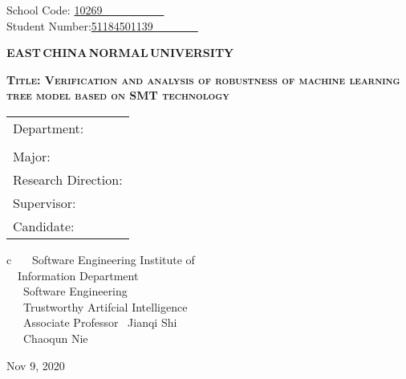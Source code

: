 \newpage

\pagestyle{empty}

\hskip 1.4cm {School Code: \underline{10269~~~~~~~~~~~\qquad}}\\
\hspace*{\fill} {Student Number:\underline{51184501139~~~~~~~~}}
\vskip 2cm

\begin{center}
{\Huge \bf EAST\,CHINA\,NORMAL\,UNIVERSITY}
\end{center}

\vskip 3cm

\begin{center}
{\huge \bf \scshape Title: Verification and analysis of robustness of machine learning tree model based on SMT technology}
\end{center}

\vskip 2cm {\large
\begin{center}
\begin{tabular}{l}
Department:\\
			\\
Major:\\
Research Direction:\\
Supervisor:\\
Candidate:
\end{tabular}
\begin{tabular}c
~~~Software Engineering Institute of\\
\hline ~~Information Department  \\
\hline ~~~Software Engineering  \\
\hline ~~~Trustworthy Artifcial Intelligence\\
\hline ~~~Associate Professor ~Jianqi Shi~  \\
\hline ~~~Chaoqun Nie  \\
\hline
\end{tabular}
\end{center}}

\vskip 30mm

\begin{center}
{\Large Nov 9, 2020}
\end{center}
